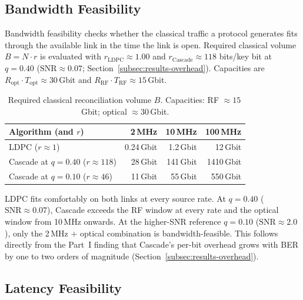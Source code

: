 \documentclass{UoYCSproject}
\begin{document}
\subsection{Bandwidth Feasibility}
\label{subsec:results-comm-feasibility}

Bandwidth feasibility checks whether the classical traffic a protocol
generates fits through the available link in the time the link is open.
Required classical volume $B = N \cdot r$ is evaluated with
$r_{\text{LDPC}} \approx 1.00$ and
$r_{\text{Cascade}} \approx 118$ bits/key bit at $q = 0.40$
($\mathrm{SNR}\!\approx\!0.07$; Section~\ref{subsec:results-overhead}).
Capacities are $R_{\text{opt}} \cdot T_{\text{opt}} \approx 30$\,Gbit and
$R_{\text{RF}} \cdot T_{\text{RF}} \approx 15$\,Gbit.

\begin{table}[H]
    \centering
    \small
    \begin{tabular}{lrrr}
        \toprule
        Algorithm (and $r$) & 2\,MHz & 10\,MHz & 100\,MHz\\
        \midrule
        LDPC ($r \approx 1$)                  & 0.24\,Gbit & 1.2\,Gbit  & 12\,Gbit  \\
        Cascade at $q{=}0.40$ ($r \approx 118$) & 28\,Gbit   & 141\,Gbit  & 1410\,Gbit\\
        Cascade at $q{=}0.10$ ($r \approx 46$)  & 11\,Gbit   & 55\,Gbit   & 550\,Gbit \\
        \bottomrule
    \end{tabular}
    \caption{Required classical reconciliation volume $B$. Capacities:
    RF $\approx 15$\,Gbit; optical $\approx 30$\,Gbit.}
    \label{tab:part2-bandwidth}
\end{table}

LDPC fits comfortably on both links at every source rate. At $q = 0.40$
($\mathrm{SNR}\!\approx\!0.07$), Cascade exceeds the RF window at every rate
and the optical window from 10\,MHz onwards. At the higher-SNR reference
$q = 0.10$ ($\mathrm{SNR}\!\approx\!2.0$), only the 2\,MHz + optical
combination is bandwidth-feasible. This follows directly from the Part~I
finding that Cascade's per-bit overhead grows with BER by one to two orders
of magnitude (Section~\ref{subsec:results-overhead}).

\subsection{Latency Feasibility}
\label{subsec:results-latency-feasibility}
\end{document}
